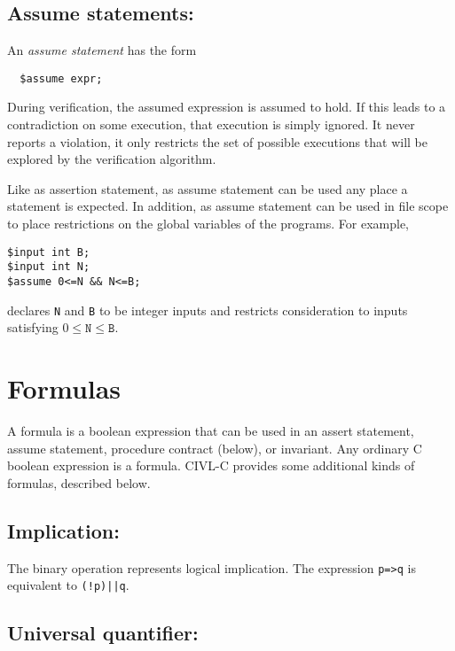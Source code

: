 

\subsection{Assume statements: \cassume}

An \emph{assume statement} has the form
\begin{verbatim}
  $assume expr;
\end{verbatim}
During verification, the assumed expression is assumed to hold.  If
this leads to a contradiction on some execution, that execution is
simply ignored.  It never reports a violation, it only restricts the
set of possible executions that will be explored by the verification
algorithm.

Like as assertion statement, as assume statement can be used any place
a statement is expected.  In addition, as assume statement can be used
in file scope to place restrictions on the global variables of the
programs.  For example,
\begin{verbatim}
$input int B;
$input int N;
$assume 0<=N && N<=B;
\end{verbatim}
declares \texttt{N} and \texttt{B} to be integer inputs and restricts
consideration to inputs satisfying $0\leq\texttt{N}\leq\texttt{B}$.


\section{Formulas}

A formula is a boolean expression that can be used in an assert
statement, assume statement, procedure contract (below), or invariant.
Any ordinary C boolean expression is a formula. CIVL-C provides some
additional kinds of formulas, described below.

\subsection{Implication: \cimplies}

The binary operation \cimplies{} represents logical implication.
The expression \verb!p=>q! is equivalent to \verb~(!p)||q~.

\subsection{Universal quantifier: \cforall}

